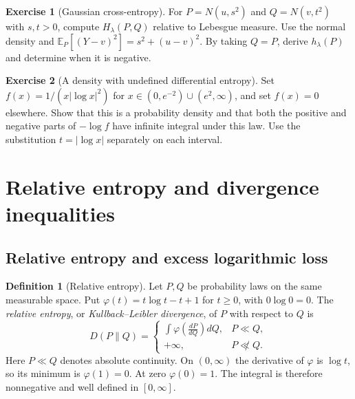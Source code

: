 \documentclass[11pt,oneside]{book}
\theoremstyle{definition}
\newtheorem{definition}[theorem]{Definition}
\newtheorem{exercise}{Exercise}[section]
\theoremstyle{remark}
\begin{document}
\begin{exercise}[Gaussian cross-entropy]
\label{exer:gaussian-cross-entropy}
For $P=N(u,s^2)$ and $Q=N(v,t^2)$ with $s,t>0$, compute
$H_\lambda(P,Q)$ relative to Lebesgue measure. Use the normal density
and $\mathbb E_P[(Y-v)^2]=s^2+(u-v)^2$. By taking $Q=P$, derive
$h_\lambda(P)$ and determine when it is negative.
\end{exercise}

\begin{exercise}[A density with undefined differential entropy]
\label{exer:undefined-differential-entropy}
Set $f(x)=1/(x|\log x|^2)$ for
$x\in(0,e^{-2})\cup(e^2,\infty)$, and set $f(x)=0$ elsewhere.
Show that this is a probability density and that both the positive
and negative parts of $-\log f$ have infinite integral under this
law. Use the substitution $t=|\log x|$ separately on each interval.
\end{exercise}


\clearpage
\section{Relative entropy and divergence inequalities}
\label{sec:relative-entropy}

\subsection{Relative entropy and excess logarithmic loss}
\label{subsec:relative-entropy-definition}

\begin{definition}[Relative entropy]
\label{def:relative-entropy}
Let $P,Q$ be probability laws on the same measurable space. Put
$\varphi(t)=t\log t-t+1$ for $t\geq0$, with $0\log 0=0$.
The \emph{relative entropy}, or \emph{Kullback--Leibler divergence},
of $P$ with respect to $Q$ is
\[
D(P\|Q)=
\begin{cases}
\displaystyle\int\varphi\!\left(\frac{dP}{dQ}\right)dQ,
 & P\ll Q,\\[4pt]
+\infty, & P\not\ll Q.
\end{cases}
\]
Here $P\ll Q$ denotes absolute continuity. On $(0,\infty)$ the
derivative of $\varphi$ is $\log t$, so its minimum is $\varphi(1)=0$.
At zero $\varphi(0)=1$. The integral is therefore nonnegative and
well defined in $[0,\infty]$.
\end{definition}
\end{document}
